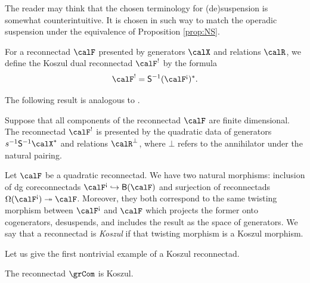 The reader may think that the chosen terminology for (de)suspension is somewhat counterintuitive. It is chosen in such way to match the operadic suspension under the equivalence of Proposition \ref{prop:NS}. 

\begin{defi}
For a reconnectad $\calF$ presented by generators $\calX$ and relations $\calR$, we define the Koszul dual reconnectad $\calF^!$ by the formula
 \[
\calF^!=\mathsf{S}^{-1}(\calF^{\text{!`}})^*.
 \]
\end{defi} 

The following result is analogous to \cite[Prop.~7.2.4]{MR2954392}.

\begin{prop}
Suppose that all components of the reconnectad $\calF$ are finite dimensional. The reconnectad $\calF^!$ is presented by the quadratic data of generators $s^{-1}\mathsf{S}^{-1}\calX^*$ and relations $\calR^\bot$, where $\bot$ refers to the annihilator under the natural pairing. 
\end{prop}

Let $\calF$ be a quadratic reconnectad. We have two natural morphisms: inclusion of dg coreconnectads $\calF^{\text{!`}} \hookrightarrow \mathsf{B}(\calF)$ and surjection of reconnectads $\Omega(\calF^{\text{!`}}) \twoheadrightarrow \calF$. Moreover, they both correspond to the same twisting morphism between $\calF^{\text{!`}}$ and $\calF$ which projects the former onto cogenerators, desuspends, and includes the result as the space of generators. We say that a reconnectad is \emph{Koszul} if that twisting morphism is a Koszul morphism.

Let us give the first nontrivial example of a Koszul reconnectad. 

\begin{prop}\label{prop:cobar-associahedra}
The reconnectad $\grCom$ is Koszul.
\end{prop}

